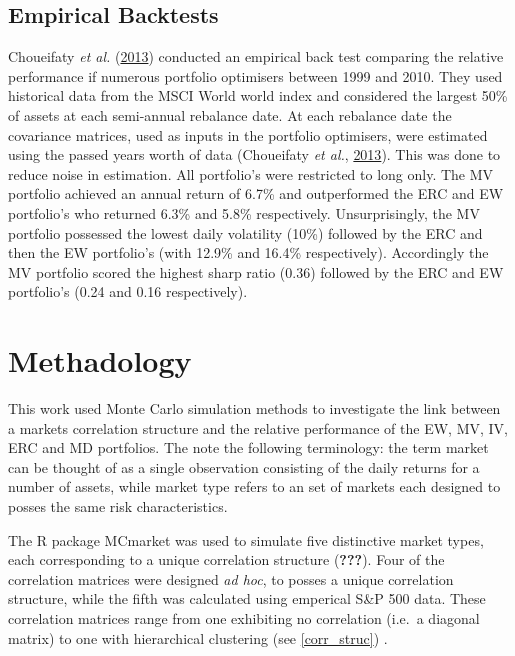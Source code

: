 \documentclass[11pt,preprint, authoryear]{elsarticle}
\numberwithin{equation}{section}
\numberwithin{figure}{section}
\numberwithin{table}{section}
\begin{document}
\hypertarget{empirical-backtests}{%
\subsection{Empirical Backtests}\label{empirical-backtests}}

Choueifaty \emph{et al.} (\protect\hyperlink{ref-choueifaty2013}{2013})
conducted an empirical back test comparing the relative performance if
numerous portfolio optimisers between 1999 and 2010. They used
historical data from the MSCI World world index and considered the
largest 50\% of assets at each semi-annual rebalance date. At each
rebalance date the covariance matrices, used as inputs in the portfolio
optimisers, were estimated using the passed years worth of data
(Choueifaty \emph{et al.},
\protect\hyperlink{ref-choueifaty2013}{2013}). This was done to reduce
noise in estimation. All portfolio's were restricted to long only. The
MV portfolio achieved an annual return of 6.7\% and outperformed the ERC
and EW portfolio's who returned 6.3\% and 5.8\% respectively.
Unsurprisingly, the MV portfolio possessed the lowest daily volatility
(10\%) followed by the ERC and then the EW portfolio's (with 12.9\% and
16.4\% respectively). Accordingly the MV portfolio scored the highest
sharp ratio (0.36) followed by the ERC and EW portfolio's (0.24 and 0.16
respectively).

\hypertarget{methadology}{%
\section{Methadology}\label{methadology}}

This work used Monte Carlo simulation methods to investigate the link
between a markets correlation structure and the relative performance of
the EW, MV, IV, ERC and MD portfolios. The note the following
terminology: the term market can be thought of as a single observation
consisting of the daily returns for a number of assets, while market
type refers to an set of markets each designed to posses the same risk
characteristics.

The R package MCmarket was used to simulate five distinctive market
types, each corresponding to a unique correlation structure
({\textbf{???}}). Four of the correlation matrices were designed
\emph{ad hoc}, to posses a unique correlation structure, while the fifth
was calculated using emperical S\&P 500 data. These correlation matrices
range from one exhibiting no correlation (i.e.~a diagonal matrix) to one
with hierarchical clustering (see \ref{corr_struc}) .
\end{document}
